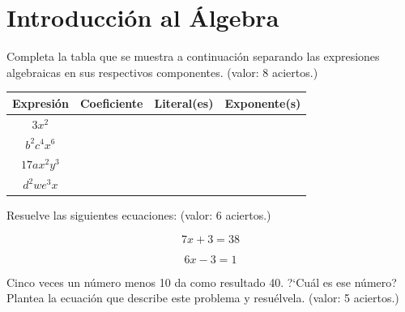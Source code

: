 \documentclass[11pt]{article}
\begin{document}

\vspace{2cm}
\section{Introducci\'on al \'Algebra} %
\label{sec:introducci'on_al_'algebra}

Completa la tabla que se muestra a continuaci\'on separando las expresiones
algebraicas en sus respectivos componentes. \hfill(valor: 8 aciertos.)

\begin{center}
\bgroup
\def\arraystretch{2}
\begin{tabular}{|c|c|c|c|}
\hline
Expresi\'on & Coeficiente & Literal(es) & Exponente(s)  \\ \hline 
$3x^2$ &&&\\ \hline
$b^2c^4x^6$ &&&\\ \hline
$17ax^2y^3$ &&&\\ \hline
$d^2we^3x$ &&&\\ \hline
\end{tabular}
\egroup
\end{center}

\vspace{5mm}
Resuelve las siguientes ecuaciones: \hfill(valor: 6 aciertos.)

\vspace{-8mm}
\begin{multicols}{2}

\begin{equation*}
7x + 3 = 38
\end{equation*}

\begin{equation*}
6x - 3 = 1
\end{equation*}

\end{multicols}

\vspace{5cm}
Cinco veces un n\'umero menos 10 da como resultado 40. ?`Cu\'al es ese n\'umero?
Plantea la ecuaci\'on que describe este problema y resu\'elvela. \hfill(valor: 5
aciertos.)


\end{document}
